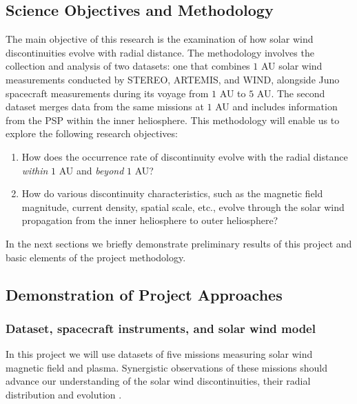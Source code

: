 \documentclass[
  letterpaper,
  DIV=11,
  numbers=noendperiod]{scrartcl}
\begin{document}
\subsection{Science Objectives and
Methodology}\label{science-objectives-and-methodology}

The main objective of this research is the examination of how solar wind
discontinuities evolve with radial distance. The methodology involves
the collection and analysis of two datasets: one that combines \(1\) AU
solar wind measurements conducted by STEREO, ARTEMIS, and WIND,
alongside Juno spacecraft measurements during its voyage from \(1\) AU
to \(5\) AU. The second dataset merges data from the same missions at
\(1\) AU and includes information from the PSP within the inner
heliosphere. This methodology will enable us to explore the following
research objectives:

\begin{enumerate}
\def\labelenumi{\arabic{enumi}.}
\item
  How does the occurrence rate of discontinuity evolve with the radial
  distance \emph{within} \(1\) AU and \emph{beyond} \(1\) AU?
\item
  How do various discontinuity characteristics, such as the magnetic
  field magnitude, current density, spatial scale, etc., evolve through
  the solar wind propagation from the inner heliosphere to outer
  heliosphere?
\end{enumerate}

In the next sections we briefly demonstrate preliminary results of this
project and basic elements of the project methodology.

\subsection{Demonstration of Project
Approaches}\label{demonstration-of-project-approaches}

\subsubsection{Dataset, spacecraft instruments, and solar wind
model}\label{dataset-spacecraft-instruments-and-solar-wind-model}

In this project we will use datasets of five missions measuring solar
wind magnetic field and plasma. Synergistic observations of these
missions should advance our understanding of the solar wind
discontinuities, their radial distribution and evolution
\citep{velli2020}.
\end{document}

